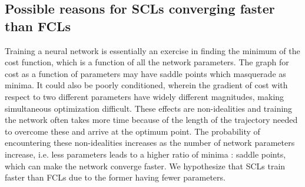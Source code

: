 \documentclass[conference]{IEEEtran}
\begin{document}
\subsection{Possible reasons for SCLs converging faster than FCLs}\label{appendix-sparse-convergence}
Training a neural network is essentially an exercise in finding the minimum of the cost function, which is a function of all the network parameters. The graph for cost as a function of parameters may have saddle points %
which masquerade as minima. It could also be poorly conditioned, wherein the gradient of cost with respect to two different parameters have widely different magnitudes, making simultaneous optimization difficult. These effects are non-idealities and training the network often takes more time because of the length of the trajectory needed to overcome these and arrive at the optimum point. The probability of encountering these non-idealities increases as the number of network parameters increase, i.e. less parameters leads to a higher ratio of minima : saddle points, which can make the network converge faster. We hypothesize that SCLs train faster than FCLs due to the former having fewer parameters.






\end{document}
